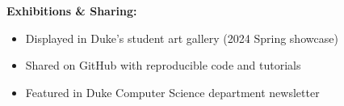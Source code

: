 \vspace{1em}

\textbf{Exhibitions \& Sharing:}
\begin{itemize}[leftmargin=1.2em, itemsep=0.1em]
  \item Displayed in Duke's student art gallery (2024 Spring showcase)
  \item Shared on GitHub with reproducible code and tutorials
  \item Featured in Duke Computer Science department newsletter
\end{itemize}


